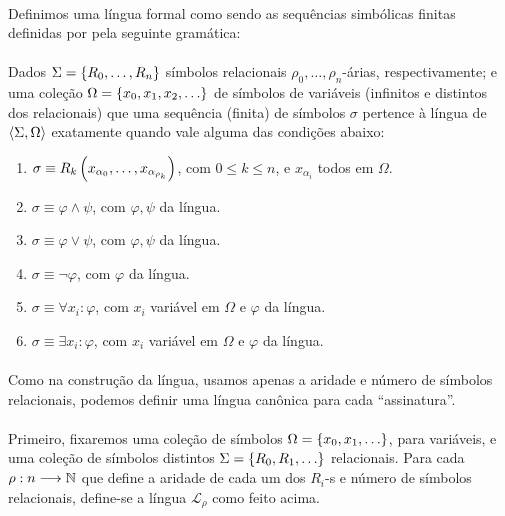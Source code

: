         \paragraph{}
            Definimos uma língua formal como sendo 
            as sequências simbólicas finitas definidas
            por pela seguinte gramática:
        \paragraph{}
            Dados $\Sigma=\SET{R_0}{\ldots}{R_n}$ símbolos 
            relacionais $\rho_0,\ldots,\rho_n$-árias,
            respectivamente; e uma coleção $\Omega
            =\SET{x_0}{x_1}{x_2}{\ldots}$ de símbolos 
            de variáveis (infinitos e distintos dos relacionais)
            que uma sequência (finita) de símbolos $\sigma$ 
            pertence à língua de $\TUPLE{\Sigma}{\Omega}$  
            exatamente quando vale alguma das 
            condições abaixo:
        \begin{enumerate}[label=\alph*)]
            \item $\sigma\equiv R_k\POINT{x_{\alpha_0}}{\ldots}{x_{\alpha_{\rho_k}}}$, com $0\leq k\leq n$, e $x_{\alpha_i}$ todos em $\Omega$.
            \item $\sigma\equiv \varphi\land\psi$, com $\varphi,\psi$ da língua.
            \item $\sigma\equiv \varphi\lor \psi$, com $\varphi,\psi$ da língua.
            \item $\sigma\equiv \neg\varphi$, com $\varphi$ da língua.
            \item $\sigma\equiv \forall x_i:\varphi$, com $x_i$ variável em $\Omega$ e $\varphi$ da língua.
            \item $\sigma\equiv \exists x_i:\varphi$, com $x_i$ variável em $\Omega$ e $\varphi$ da língua.
        \end{enumerate}
        \paragraph{}
            Como na construção da língua, usamos 
            apenas a aridade e número de 
            símbolos relacionais, podemos 
            definir uma língua canônica para 
            cada ``assinatura''. 
        \paragraph{}
            Primeiro, fixaremos uma coleção 
            de símbolos $\Omega=\SET{x_0}
            {x_1}{\ldots}$, para variáveis, 
            e uma coleção de símbolos 
            distintos $\Sigma=\SET{R_0}
            {R_1}{\ldots}$ relacionais.
            Para cada $\rho:n\longrightarrow\mathbb{N}$
            que define a aridade de cada um dos 
            $R_i$-s e número de símbolos relacionais,
            define-se a língua $\mathcal{L}_\rho$ 
            como feito acima.
            

